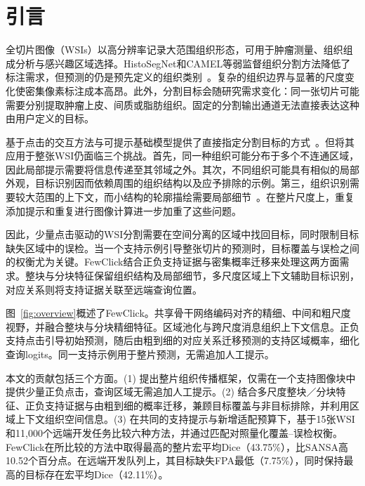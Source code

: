 \section{引言}
全切片图像（WSIs）以高分辨率记录大范围组织形态，可用于肿瘤测量、组织组成分析与感兴趣区域选择。HistoSegNet和CAMEL等弱监督组织分割方法降低了标注需求，但预测的仍是预先定义的组织类别~\cite{chan2019histosegnet,xu2019camel}。复杂的组织边界与显著的尺度变化使密集像素标注成本高昂。此外，分割目标会随研究需求变化：同一张切片可能需要分别提取肿瘤上皮、间质或脂肪组织。固定的分割输出通道无法直接表达这种由用户定义的目标。

基于点击的交互方法与可提示基础模型提供了直接指定分割目标的方式~\cite{sofiiuk2022ritm,liu2023simpleclick,kirillov2023sam}。但将其应用于整张WSI仍面临三个挑战。首先，同一种组织可能分布于多个不连通区域，因此局部提示需要将信息传递至其邻域之外。其次，不同组织可能具有相似的局部外观，目标识别因而依赖周围的组织结构以及应予排除的示例。第三，组织识别需要较大范围的上下文，而小结构的轮廓描绘需要局部细节~\cite{tokunaga2019awmf,vanrijthoven2021hooknet,ho2021dmmn}。在整片尺度上，重复添加提示和重复进行图像计算进一步加重了这些问题。

因此，少量点击驱动的WSI分割需要在空间分离的区域中找回目标，同时限制目标缺失区域中的误检。当一个支持示例引导整张切片的预测时，目标覆盖与误检之间的权衡尤为关键。FewClick结合正负支持证据与密集概率迁移来处理这两方面需求。整块与分块特征保留组织结构及局部细节，多尺度区域上下文辅助目标识别，对应关系则将支持证据关联至远端查询位置。

图~\ref{fig:overview}概述了FewClick。共享骨干网络编码对齐的精细、中间和粗尺度视野，并融合整块与分块精细特征。区域池化与跨尺度消息组织上下文信息。正负支持点击引导初始预测，随后由粗到细的对应关系迁移预测的支持区域概率，细化查询logits。同一支持示例用于整片预测，无需追加人工提示。

本文的贡献包括三个方面。(1) 提出整片组织传播框架，仅需在一个支持图像块中提供少量正负点击，查询区域无需追加人工提示。(2) 结合多尺度整块／分块特征、正负支持证据与由粗到细的概率迁移，兼顾目标覆盖与非目标排除，并利用区域上下文组织空间信息。(3) 在共同的支持提示与新增适配预算下，基于15张WSI和11,000个远端开发任务比较六种方法，并通过匹配对照量化覆盖–误检权衡。FewClick在所比较的方法中取得最高的整片宏平均Dice（43.75\%），比SANSA高10.52个百分点。在远端开发队列上，其目标缺失FPA最低（7.75\%），同时保持最高的目标存在宏平均Dice（42.11\%）。
